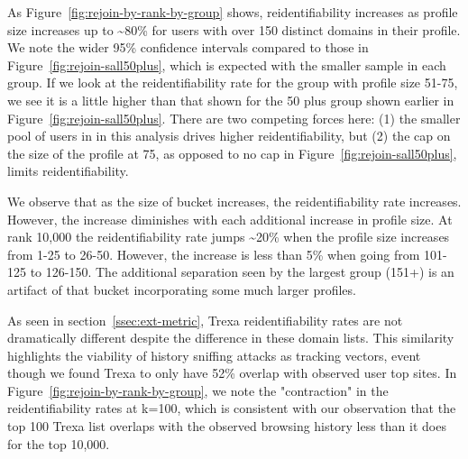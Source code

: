 \documentclass[letterpaper,twocolumn,10pt]{article}
\begin{document}
%
As Figure~\ref{fig:rejoin-by-rank-by-group} shows, reidentifiability increases as profile size increases up to \textasciitilde{}80\% for users with over 150 distinct domains in their profile.
We note the wider 95\% confidence intervals compared to those in Figure~\ref{fig:rejoin-sall50plus}, which is expected with the smaller sample in each group.
If we look at the reidentifiability rate for the group with profile size 51-75, we see it is a little higher than that shown for the 50 plus group shown earlier in Figure~\ref{fig:rejoin-sall50plus}. 
There are two competing forces here: (1) the smaller pool of users in in this analysis drives higher reidentifiability, but (2) the cap on the size of the profile at 75, as opposed to no cap in Figure~\ref{fig:rejoin-sall50plus}, limits reidentifiability.

We observe that as the size of bucket increases, the reidentifiability rate increases. 
However, the increase diminishes with each additional increase in profile size.
At rank 10,000 the reidentifiability rate jumps \textasciitilde{}20\% when the profile size increases from 1-25 to 26-50. 
However, the increase is less than 5\% when going from 101-125 to 126-150.
The additional separation seen by the largest group (151+) is an artifact of that bucket incorporating some much larger profiles.

As seen in section~\ref{ssec:ext-metric}, Trexa reidentifiability rates are not dramatically different despite the difference in these domain lists. 
This similarity highlights the viability of history sniffing attacks as tracking vectors, event though we found Trexa to only have 52\% overlap with observed user top sites.
In Figure~\ref{fig:rejoin-by-rank-by-group}, we note the "contraction" in the reidentifiability rates at k=100, which is consistent with our observation that the top 100 Trexa list overlaps with the observed browsing history less than it does for the top 10,000.
%
\end{document}
